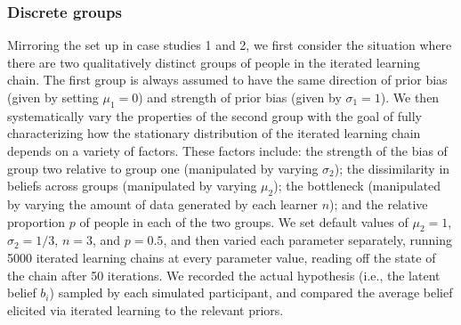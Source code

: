 \documentclass[doc]{apa6}
\begin{document}
\subsubsection{Discrete groups} Mirroring the set up in case studies 1 and 2, we first consider the situation where there are two qualitatively distinct groups of people in the iterated learning chain. The first group is always assumed to have the same direction of prior bias (given by setting $\mu_1=0$) and strength of prior bias (given by $\sigma_1=1$). We then systematically vary the properties of the second group with the goal of fully characterizing how the stationary distribution of the iterated learning chain depends on a variety of factors. These factors include: the strength of the bias of group two relative to group one (manipulated by varying $\sigma_2$); the dissimilarity in beliefs across groups (manipulated by varying $\mu_2$); the bottleneck (manipulated by varying the amount of data generated by each learner $n$); and the relative proportion $p$ of people in each of the two groups. We set default values of $\mu_2=1$, $\sigma_2=1/3$, $n=3$, and $p=0.5$, and then varied each parameter separately, running 5000 iterated learning chains at every parameter value, reading off the state of the chain after 50 iterations. We recorded the actual hypothesis (i.e., the latent belief $b_i$) sampled by each simulated participant, and compared the average belief elicited via iterated learning to the relevant priors.
\end{document}
